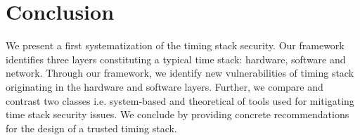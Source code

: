 \section{Conclusion}
We present a first systematization of the timing stack security. Our framework identifies three layers constituting a typical time stack: hardware, software and network. Through our framework, we identify new vulnerabilities of timing stack originating in the hardware and software layers. Further, we compare and contrast two classes i.e. system-based and theoretical of tools used for mitigating time stack security issues. We conclude by providing concrete recommendations for the design of a trusted timing stack.
